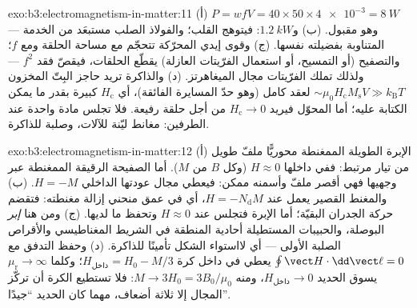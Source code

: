\begin{solution}{exo:b3:electromagnetism-in-matter:11}
(أ) $P = wfV = 40\times50\times\num{4e-3} = \qty{8}{W}$ ---
وهو مقبول. (ب) و$\qty{1.2}{kW}$: فيتوهج القلب؛ والفولاذ الصلب
مستبعَد من الخدمة المتناوبة بفضيلته نفسها. (ج) وقوى إيدي المحرّكة
تتحجّم مع مساحة الحلقة ومع $f$؛ والتصفيح (أو التمسيح، أو استعمال
الفرّيتات العازلة) يقطّع الحلقات، فيقصّ فقد $f^2$ ---
ولذلك تملك الفرّيتات مجال الميغاهرتز. (د) والذاكرة تريد
حاجز البِتّ المخزون $\sim\mu_0H_{\text{c}}M_{\text{s}}V \gg
k_{\text{B}}T$ لعقد كامل (وهو حدّ المسايرة الفائقة)، أي
$H_{\text{c}}$ كبيرة بقدر ما يمكن الكتابة عليه؛ أما المحوّل فيريد
$H_{\text{c}} \to 0$ من أجل حلقة رفيعة. فلا تجلس مادة واحدة عند
الطرفين: مغانط ليّنة للآلات، وصلبة للذاكرة.
\end{solution}

\begin{solution}{exo:b3:electromagnetism-in-matter:12}
(أ) الإبرة الطويلة الممغنطة محوريًّا ملفّ طويل من تيار
مرتبط: ففي داخلها $H \approx 0$ (وكل $B$ من $M$). أما الصفيحة
الرقيقة الممغنطة عبر وجهيها فهي أقصر ملفّ وأسمنه
ممكن: فيعطي مجال عودتها الداخلي $H = -M$. (ب)
والمغنط القصير يعمل عند $H = -N_{\text{d}}M$، أي في عمق منحني
إزالة مغنطته: فتقضم حركة الجدران البقيّة؛ أما
الإبرة فتجلس عند $H \approx 0$ وتحفظ ما لديها. (ج) ومن هنا
\emph{إبر} البوصلة، والحبيبات المستطيلة أحادية المنطقة في
الشريط المغناطيسي والأقراص الصلبة الأولى --- أي لااستواء الشكل تأمينًا
للذاكرة. (د) وحفظ التدفق مع $\oint\vect H\cdot
\dd\vect\ell = 0$ يعطي في داخل كرة $H_{\text{داخل}} =
H_0 - M/3$؛ وكلما $\mu_{\text{r}}\to\infty$ يسوق الحديد
$H_{\text{داخل}}\to0$، ومنه $M \to 3H_0 = 3B_0/\mu_0$: فلا تستطيع الكرة
أن تركّز المجال إلا ثلاثة أضعاف، مهما كان الحديد ``جيدًا''.
\end{solution}

